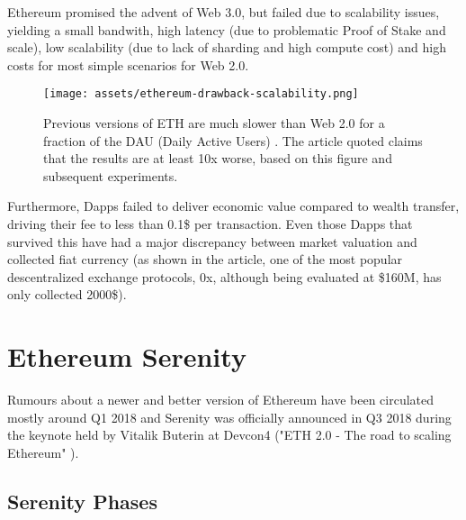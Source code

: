 \documentclass[runningheads]{llncs}
\begin{document}
Ethereum promised the advent of Web 3.0, but failed due to scalability issues, yielding a small bandwith, high latency (due to problematic Proof of Stake and scale), low scalability (due to lack of sharding and high compute cost) and high costs for most simple scenarios for Web 2.0.

\begin{figure}
    \centering
    \texttt{[image: assets/ethereum-drawback-scalability.png]}
    \caption[Ethereum Drawbacks]{Previous versions of ETH are much slower than Web 2.0 for a fraction of the DAU (Daily Active Users) \cite{ETH1failure}. The article quoted claims that the results are at least 10x worse, based on this figure and subsequent experiments.}
    \label{fig:Serenity-1}
\end{figure}

Furthermore, Dapps failed to deliver economic value compared to wealth transfer, driving their fee to less than 0.1\$ per transaction. Even those Dapps that survived this have had a major discrepancy between market valuation and collected fiat currency (as shown in the article, one of the most popular descentralized exchange protocols, 0x, although being evaluated at \$160M, has only collected 2000\$).

\FloatBarrier
\section{Ethereum Serenity}

Rumours about a newer and better version of Ethereum have been circulated mostly around Q1 2018 and Serenity was officially announced in Q3 2018 during the keynote held by Vitalik Buterin at Devcon4 ("ETH 2.0 - The road to scaling Ethereum" \cite{KeynotePrague2018}).


\subsection{Serenity Phases}
\end{document}
